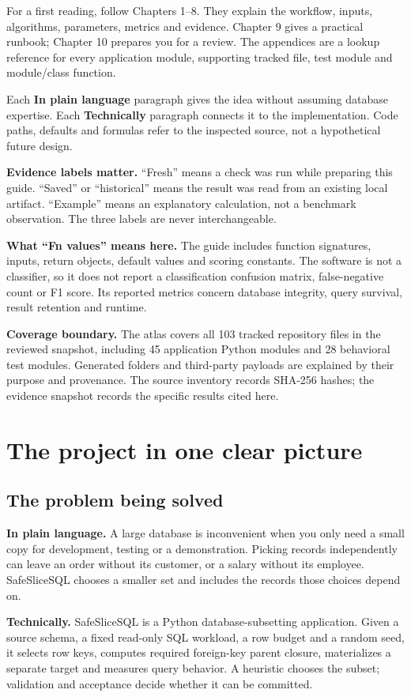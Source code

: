 \documentclass[11pt,a4paper,oneside]{report}
\newcommand{\plain}[1]{\par\textbf{In plain language.} #1\par}
\newcommand{\technical}[1]{\par\textbf{Technically.} #1\par}
\begin{document}
For a first reading, follow Chapters 1--8. They explain the workflow, inputs, algorithms, parameters, metrics and evidence. Chapter 9 gives a practical runbook; Chapter 10 prepares you for a review. The appendices are a lookup reference for every application module, supporting tracked file, test module and module/class function.

Each \textbf{In plain language} paragraph gives the idea without assuming database expertise. Each \textbf{Technically} paragraph connects it to the implementation. Code paths, defaults and formulas refer to the inspected source, not a hypothetical future design.

\textbf{Evidence labels matter.} ``Fresh'' means a check was run while preparing this guide. ``Saved'' or ``historical'' means the result was read from an existing local artifact. ``Example'' means an explanatory calculation, not a benchmark observation. The three labels are never interchangeable.

\textbf{What ``Fn values'' means here.} The guide includes function signatures, inputs, return objects, default values and scoring constants. The software is not a classifier, so it does not report a classification confusion matrix, false-negative count or F1 score. Its reported metrics concern database integrity, query survival, result retention and runtime.

\textbf{Coverage boundary.} The atlas covers all 103 tracked repository files in the reviewed snapshot, including 45 application Python modules and 28 behavioral test modules. Generated folders and third-party payloads are explained by their purpose and provenance. The source inventory records SHA-256 hashes; the evidence snapshot records the specific results cited here.

\tableofcontents
\clearpage
{}

\chapter{The project in one clear picture}
\section{The problem being solved}
\plain{A large database is inconvenient when you only need a small copy for development, testing or a demonstration. Picking records independently can leave an order without its customer, or a salary without its employee. SafeSliceSQL chooses a smaller set and includes the records those choices depend on.}
\technical{SafeSliceSQL is a Python database-subsetting application. Given a source schema, a fixed read-only SQL workload, a row budget and a random seed, it selects row keys, computes required foreign-key parent closure, materializes a separate target and measures query behavior. A heuristic chooses the subset; validation and acceptance decide whether it can be committed.}
\end{document}
